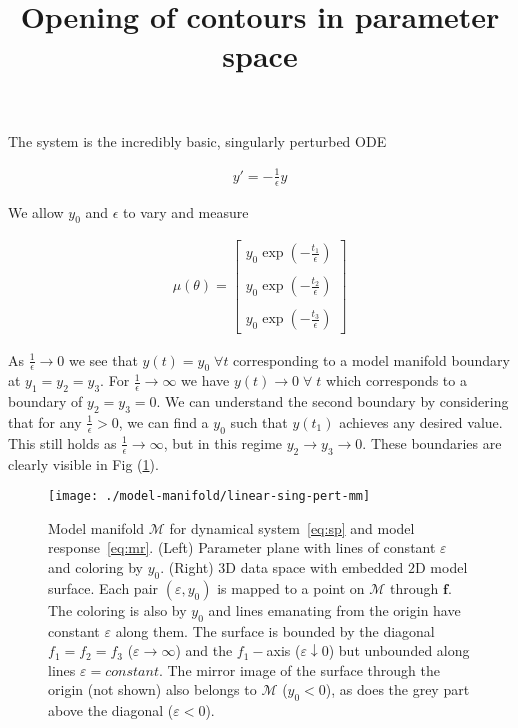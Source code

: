 \documentclass[11pt]{article}
\title{Opening of contours in parameter space}
\newcommand{\eps}{\varepsilon}
\begin{document}
\maketitle

The system is the incredibly basic, singularly perturbed ODE

\begin{align}
  y' = -\frac{1}{\epsilon} y
  \label{eq:sp}
\end{align}

We allow $y_0$ and $\epsilon$ to vary and measure

\begin{align}
  \mu(\theta) = \begin{bmatrix} y_0 \exp(-\frac{t_1}{\epsilon}) \\ \\ y_0
    \exp(-\frac{t_2}{\epsilon}) \\ \\ y_0
    \exp(-\frac{t_3}{\epsilon}) \end{bmatrix}
  \label{eq:mr}
\end{align}

As $\frac{1}{\epsilon} \rightarrow 0$ we see that $y(t) = y_0 \;
\forall t$ corresponding to a model manifold boundary at $y_1 = y_2 =
y_3$. For $\frac{1}{\epsilon} \rightarrow \infty$ we have
$y(t) \rightarrow 0 \; \forall \; t$ which corresponds to a boundary
of $y_2 = y_3 = 0$. We can understand the second boundary by
considering that for any $\frac{1}{\epsilon} > 0$, we can find a $y_0$
such that $y(t_1)$ achieves any desired value. This still holds as
$\frac{1}{\epsilon} \rightarrow \infty$, but in this regime $y_2
\rightarrow y_3 \rightarrow 0$. These boundaries are clearly visible
in Fig (\ref{fig:lmm}).

\begin{figure}[htbp]
  \centering
  \texttt{[image: ./model-manifold/linear-sing-pert-mm]}
  \caption{Model manifold $\mathcal{M}$ for dynamical
    system~\eqref{eq:sp} and model response~\eqref{eq:mr}.
(Left) Parameter plane with lines of constant $\eps$ and coloring by $y_0$.
(Right) $3$D data space with embedded $2$D model surface.
Each pair $(\eps,y_0)$ is mapped to a point on $\mathcal{M}$ through $\mathbf{f}$.
The coloring is also by $y_0$ and lines emanating from the origin have constant $\eps$ along them.
The surface is bounded by the diagonal $f_1=f_2=f_3$ ($\eps\to\infty$)
and the $f_1-$axis ($\eps\downarrow0$) but unbounded along lines
$\eps=constant$. The mirror image of the surface through the origin (not shown) also
belongs to $\mathcal{M}$ ($y_0<0$), as does the grey part above the
diagonal ($\eps<0$). \label{fig:lmm}}
\end{figure}
\end{document}
